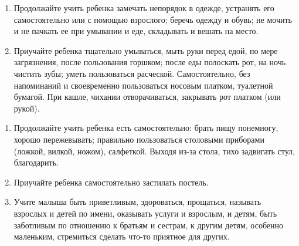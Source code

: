 \documentclass{book}
\begin{document}
\begin{enumerate}
\def\labelenumi{\arabic{enumi}.}
\item
  
  Продолжайте учить ребенка замечать непорядок в одежде, устранять его
  самостоятельно или с помощью взрослого; беречь одежду и обувь; не
  мочить и не пачкать ее при умывании и еде, складывать и вешать на
  место.
  
\item
  
  Приучайте ребенка тщательно умываться, мыть руки перед едой, по мере
  загрязнения, после пользования горшком; после еды полоскать рот, на
  ночь чистить зубы; уметь пользоваться расческой. Самостоятельно, без
  напоминаний и своевременно пользоваться носовым платком, туалетной
  бумагой. При кашле, чихании отворачиваться, закрывать рот платком (или
  рукой).
  
\end{enumerate}

\begin{enumerate}
\def\labelenumi{\arabic{enumi}.}
\setcounter{enumi}{2}
\item
  
  Продолжайте учить ребенка есть самостоятельно: брать пищу понемногу,
  хорошо пережевывать; правильно пользоваться столовыми приборами
  (ложкой, вилкой, ножом), салфеткой. Выходя из-за стола, тихо задвигать
  стул, благодарить.
  
\item
  
  Приучайте ребенка самостоятельно застилать постель.
  
\item
  
  Учите малыша быть приветливым, здороваться, прощаться, называть
  взрослых и детей по имени, оказывать услуги и взрослым, и детям, быть
  заботливым по отношению к братьям и сестрам, к другим детям, особенно
  маленьким, стремиться сделать что-то приятное для других.
  
\end{enumerate}
\end{document}
